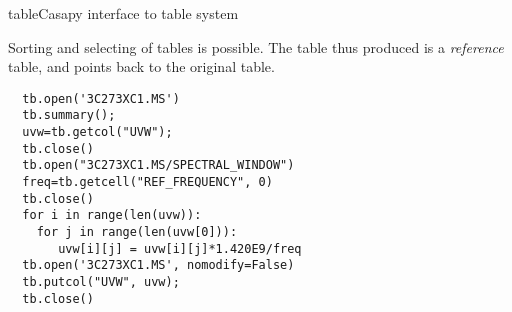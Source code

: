 \begin{ahmodule}{table}{Casapy interface to table system}
\begin{ahdescription}
Sorting and selecting of tables is possible. The table thus produced
is a {\em reference} table, and points back to the original table.

\end{ahdescription}

\begin{ahexample}
\begin{verbatim}
  tb.open('3C273XC1.MS')
  tb.summary();
  uvw=tb.getcol("UVW");
  tb.close()
  tb.open("3C273XC1.MS/SPECTRAL_WINDOW")
  freq=tb.getcell("REF_FREQUENCY", 0)
  tb.close()
  for i in range(len(uvw)):
    for j in range(len(uvw[0])):
       uvw[i][j] = uvw[i][j]*1.420E9/freq
  tb.open('3C273XC1.MS', nomodify=False)
  tb.putcol("UVW", uvw);
  tb.close()
\end{verbatim}
\end{ahexample}
\begin{ahseealso}
\item[\ahlink{tableplot}{table:tableplot}]
\end{ahseealso}


\ahobjs{}
\ahfuncs{}


\end{ahmodule}
